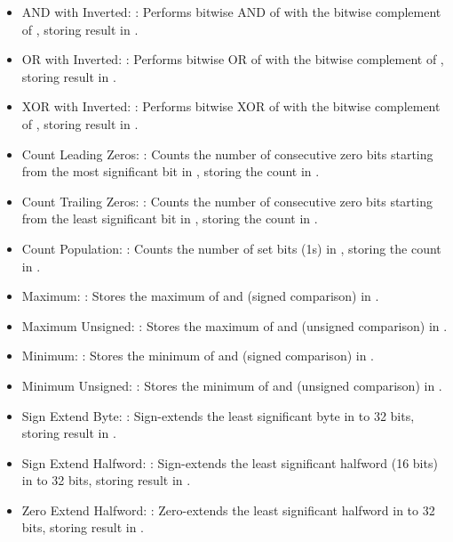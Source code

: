 \documentclass[11pt,pdftex,portrait,letterpaper]{article}
\begin{document}
\begin{itemize}
	\item AND with Inverted: : Performs bitwise AND of  with the bitwise complement of , storing result in .
	\item OR with Inverted: : Performs bitwise OR of  with the bitwise complement of , storing result in .
	\item XOR with Inverted: : Performs bitwise XOR of  with the bitwise complement of , storing result in .
	\item Count Leading Zeros: : Counts the number of consecutive zero bits starting from the most significant bit in , storing the count in .
	\item Count Trailing Zeros: : Counts the number of consecutive zero bits starting from the least significant bit in , storing the count in .
	\item Count Population: : Counts the number of set bits (1s) in , storing the count in .
	\item Maximum: : Stores the maximum of  and  (signed comparison) in .
	\item Maximum Unsigned: : Stores the maximum of  and  (unsigned comparison) in .
	\item Minimum: : Stores the minimum of  and  (signed comparison) in .
	\item Minimum Unsigned: : Stores the minimum of  and  (unsigned comparison) in .
	\item Sign Extend Byte: : Sign-extends the least significant byte in  to 32 bits, storing result in .
	\item Sign Extend Halfword: : Sign-extends the least significant halfword (16 bits) in  to 32 bits, storing result in .
	\item Zero Extend Halfword: : Zero-extends the least significant halfword in  to 32 bits, storing result in .

\end{itemize}
\end{document}
